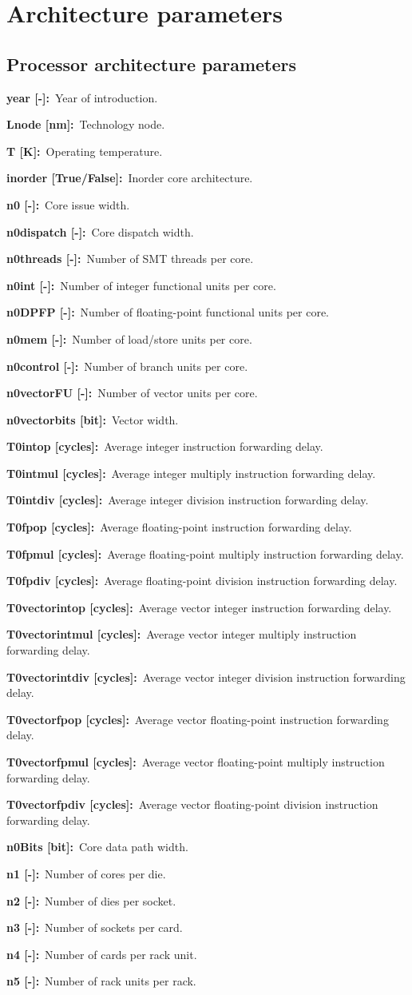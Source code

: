 \section{Architecture parameters}
\label{app:architecture-parameters}

\newcommand*{\param}[3]{\par \noindent \textbf{#1 [#2]:}~#3}

\subsection {Processor architecture parameters}

\param{year}{-}{Year of introduction.}
\param{Lnode}{nm}{Technology node.}
\param{T}{K}{Operating temperature.}
\param{inorder}{True/False}{Inorder core architecture.}
\param{n0}{-}{Core issue width.}
\param{n0dispatch}{-}{Core dispatch width.}
\param{n0threads}{-}{Number of SMT threads per core.}
\param{n0int}{-}{Number of integer functional units per core.}
\param{n0DPFP}{-}{Number of floating-point functional units per core.}
\param{n0mem}{-}{Number of load/store units per core.}
\param{n0control}{-}{Number of branch units per core.}
\param{n0vectorFU}{-}{Number of vector units per core.}
\param{n0vectorbits}{bit}{Vector width.}
\param{T0intop}{cycles}{Average integer instruction forwarding delay.}
\param{T0intmul}{cycles}{Average integer multiply instruction forwarding delay.}
\param{T0intdiv}{cycles}{Average integer division instruction forwarding delay.}
\param{T0fpop}{cycles}{Average floating-point instruction forwarding delay.}
\param{T0fpmul}{cycles}{Average floating-point multiply instruction forwarding delay.}
\param{T0fpdiv}{cycles}{Average floating-point division instruction forwarding delay.}
\param{T0vectorintop}{cycles}{Average vector integer instruction forwarding delay.}
\param{T0vectorintmul}{cycles}{Average vector integer multiply instruction forwarding delay.}
\param{T0vectorintdiv}{cycles}{Average vector integer division instruction forwarding delay.}
\param{T0vectorfpop}{cycles}{Average vector floating-point instruction forwarding delay.}
\param{T0vectorfpmul}{cycles}{Average vector floating-point multiply instruction forwarding delay.}
\param{T0vectorfpdiv}{cycles}{Average vector floating-point division instruction forwarding delay.}
\param{n0Bits}{bit}{Core data path width.}
\param{n1}{-}{Number of cores per die.}
\param{n2}{-}{Number of dies per socket.}
\param{n3}{-}{Number of sockets per card.}
\param{n4}{-}{Number of cards per rack unit.}
\param{n5}{-}{Number of rack units per rack.}
